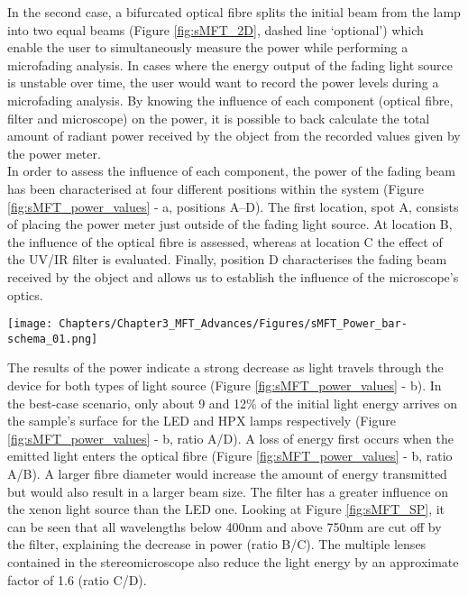 In the second case, a bifurcated optical fibre splits the initial beam from the lamp into two equal beams (Figure \ref{fig:sMFT_2D}, dashed line ‘optional’) which enable the user to simultaneously measure the power while performing a microfading analysis. In cases where the energy output of the fading light source is unstable over time, the user would want to record the power levels during a microfading analysis. By knowing the influence of each component (optical fibre, filter and microscope) on the power, it is possible to back calculate the total amount of radiant power received by the object from the recorded values given by the power meter.\\

In order to assess the influence of each component, the power of the fading beam has been characterised at four different positions within the system (Figure \ref{fig:sMFT_power_values} - a, positions A–D). The first location, spot A, consists of placing the power meter just outside of the fading light source. At location B, the influence of the optical fibre is assessed, whereas at location C the effect of the \gls{UV}/\gls{IR} filter is evaluated. Finally, position D characterises the fading beam received by the object and allows us to establish the influence of the microscope's optics.\\

\begin{figure*}
\centering
\texttt{[image: Chapters/Chapter3\_MFT\_Advances/Figures/sMFT\_Power\_bar-schema\_01.png]}
\caption[\hspace{0.3cm}Variations of power values]{Variations of power according to the position within the stereo-MFT: (a) location of each position; (b) power values for each position.}
\label{fig:sMFT_power_values}
\end{figure*}

The results of the power indicate a strong decrease as light travels through the device for both types of light source (Figure \ref{fig:sMFT_power_values} - b). In the best-case scenario, only about 9 and 12\% of the initial light energy arrives on the sample’s surface for the \gls{LED} and \acrshort{HPX} lamps respectively (Figure \ref{fig:sMFT_power_values} - b, ratio A/D). A loss of energy first occurs when the emitted light enters the optical fibre (Figure \ref{fig:sMFT_power_values} - b, ratio A/B). A larger fibre diameter would increase the amount of energy transmitted but would also result in a larger beam size. The filter has a greater influence on the xenon light source than the \gls{LED} one. Looking at Figure \ref{fig:sMFT_SP}, it can be seen that all wavelengths below 400nm and above 750nm are cut off by the filter, explaining the decrease in power (ratio B/C). The multiple lenses contained in the stereomicroscope also reduce the light energy by an approximate factor of 1.6 (ratio C/D).\\

